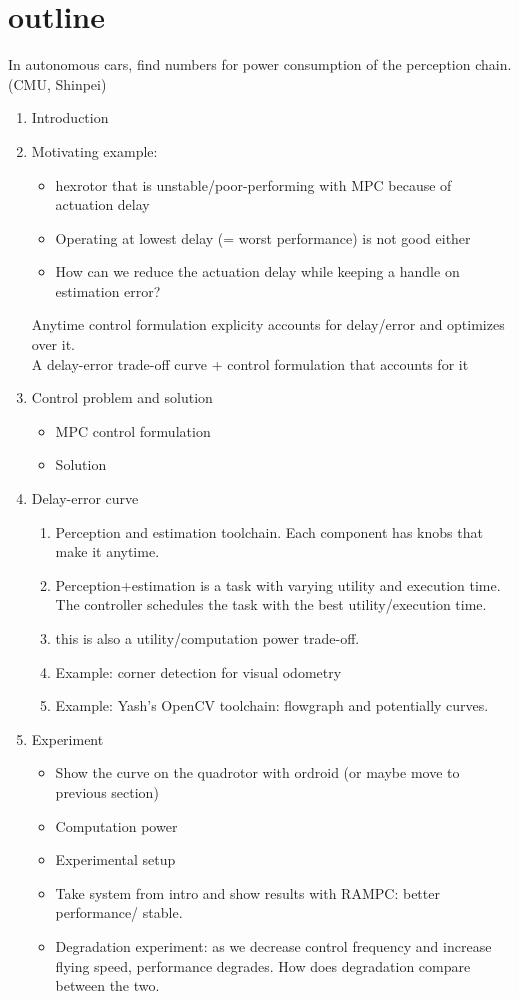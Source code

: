 \section{outline}

In autonomous cars, find numbers for power consumption of the perception chain.
(CMU, Shinpei)
\begin{enumerate}
	\item Introduction
	
	\item Motivating example: 
	\begin{itemize}
			\item hexrotor that is unstable/poor-performing with MPC because of actuation delay
			\item Operating at lowest delay (= worst performance) is not good either 
			\item How can we reduce the actuation delay while keeping a handle on estimation error? 			
	\end{itemize}
	Anytime control formulation explicity accounts for delay/error and optimizes over it.
	\\\quad A delay-error trade-off curve + control formulation that accounts for it
	
	\item Control problem and solution
	\begin{itemize}
		\item MPC control formulation 
		\item Solution
	\end{itemize}
	
	
	\item Delay-error curve 
	\begin{enumerate}
		\item Perception and estimation toolchain. Each component has knobs that make it anytime.
		\item Perception+estimation is a task with varying utility and execution time. The controller schedules the task with the best utility/execution time.
		\item this is also a utility/computation power trade-off.
		\item Example: corner detection for visual odometry
		\item Example: Yash's OpenCV toolchain: flowgraph and potentially curves.
	\end{enumerate}
	
	
	\item Experiment
	\begin{itemize}
			\item Show the curve on the quadrotor with ordroid (or maybe move to previous section)
			\item Computation power
			\item Experimental setup
			\item Take system from intro and show results with RAMPC: better performance/ stable.
			\item Degradation experiment: as we decrease control frequency and increase flying speed, performance degrades. How does degradation compare between the two.
			
	\end{itemize}

\end{enumerate}